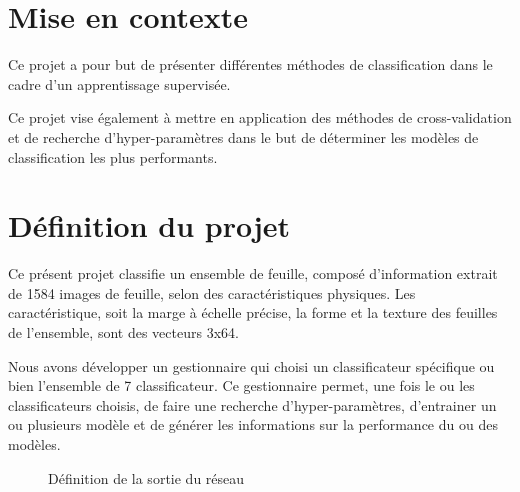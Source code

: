 \section{Mise en contexte}
Ce projet a pour but de présenter différentes méthodes de classification dans le cadre d'un apprentissage supervisée. 

Ce projet vise également à mettre en application des méthodes de cross-validation et de recherche d'hyper-paramètres dans le but de déterminer les modèles de classification les plus performants. 
\section{Définition du projet}
Ce présent projet classifie un ensemble de feuille, composé d'information extrait de 1584 images de feuille, selon des caractéristiques physiques. Les caractéristique, soit la marge à échelle précise, la forme et la texture des feuilles de l'ensemble, sont des vecteurs 3x64.

Nous avons développer un gestionnaire qui choisi un classificateur spécifique ou bien l'ensemble de 7 classificateur. Ce gestionnaire permet, une fois le ou les classificateurs choisis, de faire une recherche d'hyper-paramètres, d'entrainer un ou plusieurs modèle et de générer les informations sur la performance du ou des modèles. 
    \label{sec:definition_projet}
    
    \pagebreak
    \begin{figure}[H]
        \centering
        \caption[Définition de la sortie du réseau]{Définition de la sortie du réseau\footnotemark}
        \label{fig:definition_sortie_reseau}
    \end{figure}